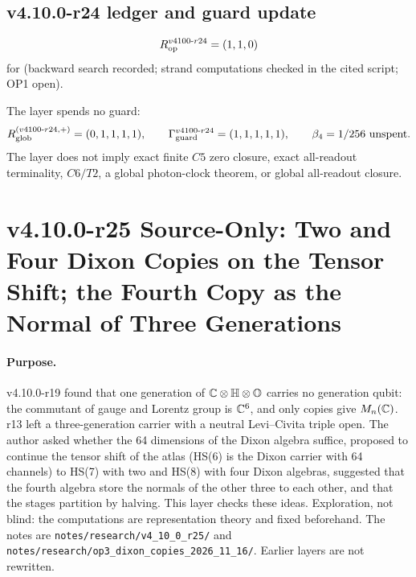 \subsection*{v4.10.0-r24 ledger and guard update}
\label{subsec:v4100-r24-ledger-guard}

\[
R_{\rm op}^{v4100\text{-}r24}=(1,1,0)
\]
for (backward search recorded; strand computations checked in the cited script; OP1 open).

The layer spends no guard:
\[
R_{\rm glob}^{(v4100\text{-}r24,+)}=(0,1,1,1,1),
\qquad
\Gamma_{\rm guard}^{v4100\text{-}r24}=(1,1,1,1,1),
\qquad
\beta_4=1/256\ \text{unspent}.
\]
The layer does not imply exact finite \(C5\) zero closure, exact all-readout terminality, \(C6/T2\), a global photon-clock theorem,
or global all-readout closure.

\clearpage
\section*{v4.10.0-r25 Source-Only: Two and Four Dixon Copies on the Tensor Shift; the Fourth Copy as the Normal of Three Generations}
\label{sec:v4100-r25-dixon-copies}

\paragraph{Purpose.}
v4.10.0-r19 found that one generation of \(\mathbb C\otimes\mathbb H\otimes\mathbb O\) carries no generation qubit: the commutant of gauge and Lorentz group is
\(\mathbb C^6\), and only copies give \(M_n(\mathbb C)\).  r13 left a three-generation carrier with a neutral Levi--Civita triple open.  The author asked
whether the 64 dimensions of the Dixon algebra suffice, proposed to continue the tensor shift of the atlas (HS(6) is the Dixon carrier with
64 channels) to HS(7) with two and HS(8) with four Dixon algebras, suggested that the fourth algebra store the normals of the other three to
each other, and that the stages partition by halving.  This layer checks these ideas.  Exploration, not blind: the computations are
representation theory and fixed beforehand.  The notes are \texttt{notes/\allowbreak research/\allowbreak v4\_10\_0\_r25/} and
\texttt{notes/\allowbreak research/\allowbreak op3\_dixon\_copies\_2026\_11\_16/}.  Earlier layers are not rewritten.

